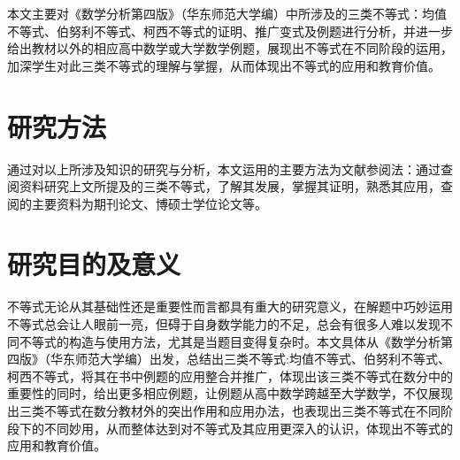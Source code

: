本文主要对《数学分析第四版》（华东师范大学编）中所涉及的三类不等式：均值不等式、伯努利不等式、柯西不等式的证明、推广变式及例题进行分析，并进一步给出教材以外的相应高中数学或大学数学例题，展现出不等式在不同阶段的运用，加深学生对此三类不等式的理解与掌握，从而体现出不等式的应用和教育价值。



\section{研究方法}

通过对以上所涉及知识的研究与分析，本文运用的主要方法为文献参阅法：通过查阅资料研究上文所提及的三类不等式，了解其发展，掌握其证明，熟悉其应用，查阅的主要资料为期刊论文、博硕士学位论文等。



\section{研究目的及意义}

不等式无论从其基础性还是重要性而言都具有重大的研究意义，在解题中巧妙运用不等式总会让人眼前一亮，但碍于自身数学能力的不足，总会有很多人难以发现不同不等式的构造与使用方法，尤其是当题目变得复杂时。本文具体从《数学分析第四版》（华东师范大学编）出发，总结出三类不等式:均值不等式、伯努利不等式、柯西不等式，将其在书中例题的应用整合并推广，体现出该三类不等式在数分中的重要性的同时，给出更多相应例题，让例题从高中数学跨越至大学数学，不仅展现出三类不等式在数分教材外的突出作用和应用办法，也表现出三类不等式在不同阶段下的不同妙用，从而整体达到对不等式及其应用更深入的认识，体现出不等式的应用和教育价值。